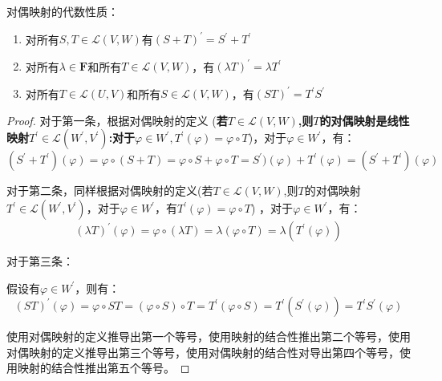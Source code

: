 \documentclass[10pt,a4paper,UTF8]{article}
\begin{document}
对偶映射的代数性质：
\begin{enumerate}
\item 对所有\(S,T\in \mathcal{L}(V,W)\)有\((S+T)^{'} = S^{'} + T^{'}\)
\item 对所有\(\lambda \in \mathbf{F}\)和所有\(T\in \mathcal{L}(V,W)\)，有\((\lambda T)^{'} = \lambda T^{'}\)
\item 对所有\(T\in \mathcal{L}(U,V)\)和所有\(S\in \mathcal{L}(V,W)\)，有\((ST)^{'} = T^{'}S^{'}\)
\end{enumerate}

\begin{proof}
对于第一条，根据对偶映射的定义 (\textbf{若\(T\in \mathcal{L}(V,W)\),则\(T\)的对偶映射是线性映射\(T^{'}\in \mathcal{L}(W^{'},V^{'})\):对于\(\varphi\in W^{'}, T^{'}(\varphi)= \varphi\circ T\)})，对于\(\varphi\in W^{'}\)，有：
\begin{equation}
\label{eq:5}
(S^{'} + T^{'})(\varphi) = \varphi \circ (S + T) = \varphi \circ S + \varphi \circ T = S^{'})(\varphi) + T^{'}(\varphi)  = (S^{'} + T^{'})(\varphi)
\end{equation}

对于第二条，同样根据对偶映射的定义(若\(T\in \mathcal{L}(V,W)\),则\(T\)的对偶映射\(T^{'}\in \mathcal{L}(W^{'},V^{'})\)，对于\(\varphi\in W^{'}\)，有\(T^{'}(\varphi) = \varphi\circ T\)) ，对于\(\varphi \in W^{'}\)，有：
\begin{equation}
\label{eq:6}
(\lambda T)^{'} (\varphi) = \varphi \circ (\lambda T) =\lambda (\varphi \circ T) = \lambda (T^{'}(\varphi))
\end{equation}

对于第三条：

假设有\(\varphi\in W^{'}\)，则有：
\begin{equation}
\label{eq:7}
(ST)^{'}(\varphi) = \varphi \circ ST = (\varphi \circ S )\circ T = T^{'}(\varphi \circ S) = T^{'}(S^{'}(\varphi)) = T^{'}S^{'}(\varphi)
\end{equation}

使用对偶映射的定义推导出第一个等号，使用映射的结合性推出第二个等号，使用对偶映射的定义推导出第三个等号，使用对偶映射的结合性对导出第四个等号，使用映射的结合性推出第五个等号。
\end{proof}
\end{document}

